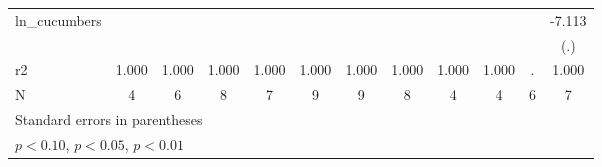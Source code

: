 \begin{table}[htbp]
\begin{tabular}{l*{11}{c}}
\addlinespace
ln\_cucumbers&                     &                     &                     &                     &                     &                     &                     &                     &                     &                     &      -7.113         \\
            &                     &                     &                     &                     &                     &                     &                     &                     &                     &                     &         (.)         \\
\midrule
r2          &       1.000         &       1.000         &       1.000         &       1.000         &       1.000         &       1.000         &       1.000         &       1.000         &       1.000         &           .         &       1.000         \\
N           &           4         &           6         &           8         &           7         &           9         &           9         &           8         &           4         &           4         &           6         &           7         \\
\bottomrule
\multicolumn{12}{l}{\footnotesize Standard errors in parentheses}\\
\multicolumn{12}{l}{\footnotesize \sym{*} \(p<0.10\), \sym{**} \(p<0.05\), \sym{***} \(p<0.01\)}\\
\end{tabular}
\end{table}
